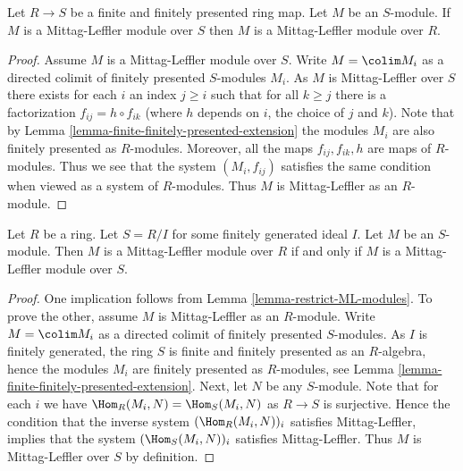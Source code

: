 \begin{lemma}
\label{lemma-restrict-ML-modules}
Let $R \to S$ be a finite and finitely presented ring map.
Let $M$ be an $S$-module.
If $M$ is a Mittag-Leffler module over $S$ then
$M$ is a Mittag-Leffler module over $R$.
\end{lemma}

\begin{proof}
Assume $M$ is a Mittag-Leffler module over $S$.
Write $M = \colim M_i$ as a directed colimit of finitely presented
$S$-modules $M_i$. As $M$ is Mittag-Leffler over $S$ there exists for each
$i$ an index $j \geq i$ such that for all $k \geq j$ there is a factorization
$f_{ij} = h \circ f_{ik}$ (where $h$ depends on $i$, the choice of $j$ and
$k$). Note that by
Lemma \ref{lemma-finite-finitely-presented-extension}
the modules $M_i$ are also finitely presented as $R$-modules. Moreover, all
the maps $f_{ij}, f_{ik}, h$ are maps of $R$-modules. Thus we see that the
system $(M_i, f_{ij})$ satisfies the same condition when viewed as a system
of $R$-modules. Thus $M$ is Mittag-Leffler as an $R$-module.
\end{proof}

\begin{lemma}
\label{lemma-mod-ideal-ML-modules}
Let $R$ be a ring.
Let $S = R/I$ for some finitely generated ideal $I$.
Let $M$ be an $S$-module.
Then $M$ is a Mittag-Leffler module over $R$ if and only if
$M$ is a Mittag-Leffler module over $S$.
\end{lemma}

\begin{proof}
One implication follows from
Lemma \ref{lemma-restrict-ML-modules}.
To prove the other, assume $M$ is Mittag-Leffler as an $R$-module.
Write $M = \colim M_i$ as a directed colimit of finitely presented
$S$-modules. As $I$ is finitely generated, the ring $S$ is finite and finitely
presented as an $R$-algebra, hence the modules $M_i$ are finitely
presented as $R$-modules, see
Lemma \ref{lemma-finite-finitely-presented-extension}.
Next, let $N$ be any $S$-module. Note that for each $i$ we have
$\Hom_R(M_i, N) = \Hom_S(M_i, N)$ as $R \to S$ is surjective.
Hence the condition that the inverse system
$(\Hom_R(M_i, N))_i$ satisfies Mittag-Leffler, implies that the system
$(\Hom_S(M_i, N))_i$ satisfies Mittag-Leffler. Thus $M$ is
Mittag-Leffler over $S$ by definition.
\end{proof}


